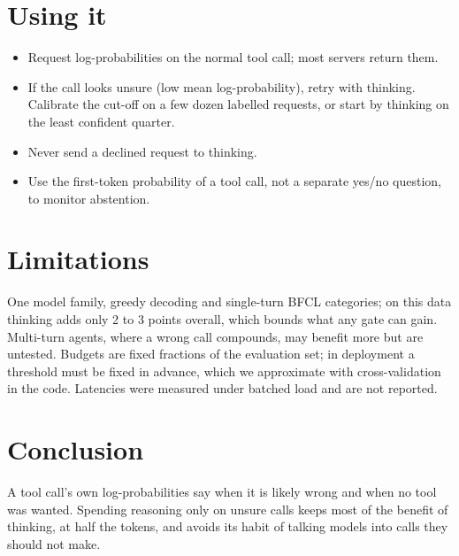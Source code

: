 \documentclass[10pt,twocolumn]{article}
\begin{document}
\section{Using it}

\begin{itemize}
\item Request log-probabilities on the normal tool call; most servers return them.
\item If the call looks unsure (low mean log-probability), retry with thinking. Calibrate the cut-off on a few dozen
labelled requests, or start by thinking on the least confident quarter.
\item Never send a declined request to thinking.
\item Use the first-token probability of a tool call, not a separate yes/no question, to monitor abstention.
\end{itemize}

\section{Limitations}

One model family, greedy decoding and single-turn BFCL categories; on this data thinking adds only 2 to 3 points
overall, which bounds what any gate can gain. Multi-turn agents, where a wrong call compounds, may benefit more but
are untested. Budgets are fixed fractions of the evaluation set; in deployment a threshold must be fixed in advance,
which we approximate with cross-validation in the code. Latencies were measured under batched load and are not
reported.

\section{Conclusion}

A tool call's own log-probabilities say when it is likely wrong and when no tool was wanted. Spending reasoning only
on unsure calls keeps most of the benefit of thinking, at half the tokens, and avoids its habit of talking models into
calls they should not make.
\end{document}
